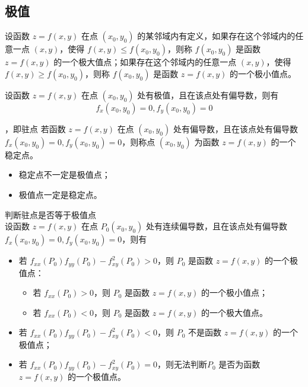 \subsection{极值}

\begin{definition}
    设函数 $z=f(x,y)$ 在点 $(x_0,y_0)$ 的某邻域内有定义，如果存在这个邻域内的任意一点 $(x,y)$，使得 $f(x,y)\leq f(x_0,y_0)$，则称 $f(x_0,y_0)$ 是函数 $z=f(x,y)$ 的一个极大值点；如果存在这个邻域内的任意一点 $(x,y)$，使得 $f(x,y)\geq f(x_0,y_0)$，则称 $f(x_0,y_0)$ 是函数 $z=f(x,y)$ 的一个极小值点。
\end{definition}

\begin{theorem}[极值的必要条件]
    设函数 $z=f(x,y)$ 在点 $(x_0,y_0)$ 处有极值，且在该点处有偏导数，则有
    \[
        f_x(x_0,y_0)=0,f_y(x_0,y_0)=0
    \]
\end{theorem}

\begin{definition}[稳定点]，即驻点
    若函数 $z=f(x,y)$ 在点 $(x_0,y_0)$ 处有偏导数，且在该点处有偏导数 $f_x(x_0,y_0)=0,f_y(x_0,y_0)=0$，则称点 $(x_0,y_0)$ 为函数 $z=f(x,y)$ 的一个稳定点。
\end{definition}

\begin{itemize}
    \item 稳定点不一定是极值点；
    \item 极值点一定是稳定点。
\end{itemize}

\begin{theorem}[极值的充分条件]判断驻点是否等于极值点\\
    设函数 $z=f(x,y)$ 在点 $P_0(x_0,y_0)$ 处有连续偏导数，且在该点处有偏导数 $f_x(x_0,y_0)=0,f_y(x_0,y_0)=0$，则有
    \begin{itemize}
        \item 若 $f_{xx}(P_0)f_{yy}(P_0)-f_{xy}^2(P_0)>0$，则 $P_0$ 是函数 $z=f(x,y)$ 的一个极值点：
              \begin{itemize}
                  \item 若 $f_{xx}(P_0)>0$，则 $P_0$ 是函数 $z=f(x,y)$ 的一个极小值点；
                  \item 若 $f_{xx}(P_0)<0$，则 $P_0$ 是函数 $z=f(x,y)$ 的一个极大值点。
              \end{itemize}
        \item 若 $f_{xx}(P_0)f_{yy}(P_0)-f_{xy}^2(P_0)<0$，则 $P_0$ 不是函数 $z=f(x,y)$ 的一个极值点；
        \item 若 $f_{xx}(P_0)f_{yy}(P_0)-f_{xy}^2(P_0)=0$，则无法判断$P_0$ 是否为函数 $z=f(x,y)$ 的一个极值点。
    \end{itemize}
\end{theorem}
